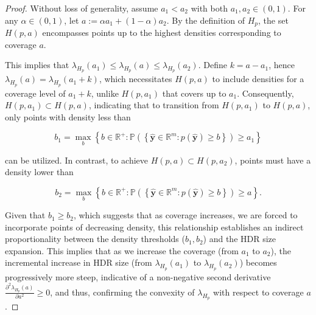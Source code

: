 \documentclass{article}
\theoremstyle{definition}
\begin{document}
\begin{proof}
Without loss of generality, assume \(a_1 < a_2\) with both \(a_1, a_2 \in (0,1)\). For any \(\alpha \in (0, 1)\), let \(a := \alpha a_1 + (1-\alpha) a_2\). By the definition of \(H_p\), the set \(H(p, a)\) encompasses points up to the highest densities corresponding to coverage \(a\).

This implies that \(\lambda_{H_p}(a_1) \leq \lambda_{H_p}(a) \leq \lambda_{H_p}(a_2)\). Define \(k = a - a_1\), hence \(\lambda_{H_p}(a) = \lambda_{H_p}(a_1 + k)\), which necessitates \(H(p, a)\) to include densities for a coverage level of \(a_1 + k\), unlike \(H(p, a_1)\) that covers up to \(a_1\). Consequently, \(H(p, a_1) \subset H(p, a)\), indicating that to transition from \(H(p, a_1)\) to \(H(p, a)\), only points with density less than 

\[b_1 = \max_b \left\{ b \in \mathbb{R}^+: \mathbb{P}\left(\left\{ \mathbf{\hat{y}} \in \mathbb{R}^m: p(\mathbf{\hat{y}}) \geq b \right\}\right) \geq a_1 \right\}\] 

can be utilized. In contrast, to achieve \(H(p, a) \subset H(p, a_2)\), points must have a density lower than 

\[b_2 = \max_b \left\{ b \in \mathbb{R}^+: \mathbb{P}\left(\left\{ \mathbf{\hat{y}} \in \mathbb{R}^m: p(\mathbf{\hat{y}}) \geq b \right\}\right) \geq a \right\}.\] 

Given that \(b_1 \geq b_2\), which suggests that as coverage increases, we are forced to incorporate points of decreasing density, this relationship establishes an indirect proportionality between the density thresholds (\(b_1, b_2\)) and the HDR size expansion. This implies that as we increase the coverage (from \(a_1\) to \(a_2\)), the incremental increase in HDR size (from \(\lambda_{H_p}(a_1)\) to \(\lambda_{H_p}(a_2)\)) becomes progressively more steep, indicative of a non-negative second derivative \(\frac{\partial^2 \lambda_{H_p}(a)}{\partial a^2} \geq 0\), and thus, confirming the convexity of \(\lambda_{H_p}\) with respect to coverage \(a\).
\end{proof}
\end{document}
